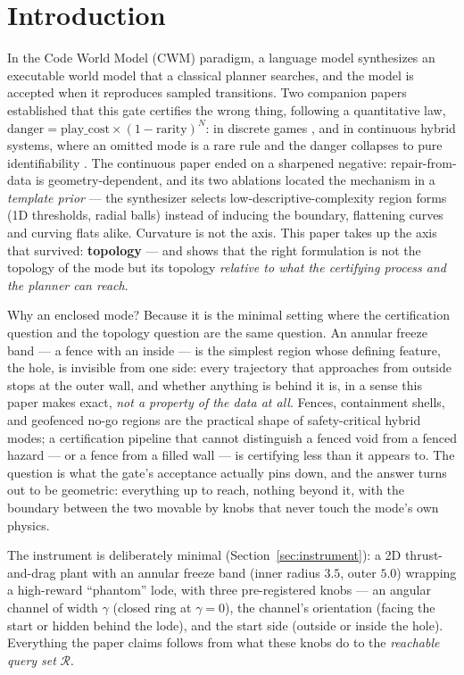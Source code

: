 \documentclass[11pt]{article}
\theoremstyle{remark}
\begin{document}
\section{Introduction}
\label{sec:intro}

In the Code World Model (CWM) paradigm, a language model synthesizes an
executable world model that a classical planner searches, and the model is
accepted when it reproduces sampled transitions. Two companion papers
established that this gate certifies the wrong thing, following a
quantitative law, $\mathrm{danger} = \mathrm{play\_cost} \times
(1-\mathrm{rarity})^N$: in discrete games \citep{aguilar2026verified}, and in
continuous hybrid systems, where an omitted mode is a rare rule and the
danger collapses to pure identifiability \citep{aguilar2026omitted}. The
continuous paper ended on a sharpened negative: repair-from-data is
geometry-dependent, and its two ablations located the mechanism in a
\emph{template prior} --- the synthesizer selects low-descriptive-complexity
region forms (1D thresholds, radial balls) instead of inducing the boundary,
flattening curves and curving flats alike. Curvature is not the axis. This
paper takes up the axis that survived: \textbf{topology} --- and shows that
the right formulation is not the topology of the mode but its topology
\emph{relative to what the certifying process and the planner can reach}.

Why an enclosed mode? Because it is the minimal setting where the
certification question and the topology question are the same question. An
annular freeze band --- a fence with an inside --- is the simplest region
whose defining feature, the hole, is invisible from one side: every
trajectory that approaches from outside stops at the outer wall, and
whether anything is behind it is, in a sense this paper makes exact,
\emph{not a property of the data at all}. Fences, containment shells, and
geofenced no-go regions are the practical shape of safety-critical hybrid
modes; a certification pipeline that cannot distinguish a fenced void from
a fenced hazard --- or a fence from a filled wall --- is certifying less
than it appears to. The question is what the gate's acceptance actually
pins down, and the answer turns out to be geometric: everything up to
reach, nothing beyond it, with the boundary between the two movable by
knobs that never touch the mode's own physics.

The instrument is deliberately minimal (Section~\ref{sec:instrument}): a 2D
thrust-and-drag plant with an annular freeze band (inner radius $3.5$, outer
$5.0$) wrapping a high-reward ``phantom'' lode, with three pre-registered
knobs --- an angular channel of width $\gamma$ (closed ring at $\gamma = 0$),
the channel's orientation (facing the start or hidden behind the lode), and
the start side (outside or inside the hole). Everything the paper claims
follows from what these knobs do to the \emph{reachable query set}
$\mathcal{R}$.
\end{document}
